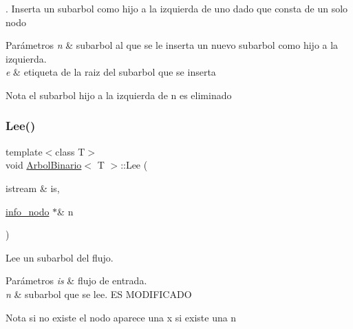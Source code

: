 . Inserta un subarbol como hijo a la izquierda de uno dado que consta de un solo nodo 


\begin{DoxyParams}{Parámetros}
{\em n} & subarbol al que se le inserta un nuevo subarbol como hijo a la izquierda. \\
\hline
{\em e} & etiqueta de la raiz del subarbol que se inserta \\
\hline
\end{DoxyParams}
\begin{DoxyNote}{Nota}
el subarbol hijo a la izquierda de n es eliminado 
\end{DoxyNote}
\mbox{\label{classArbolBinario_a4bc2c798ca826b372308d4c26e0ff4cb}} 
\subsubsection{\texorpdfstring{Lee()}{Lee()}}
{\footnotesize\ttfamily template$<$class T$>$ \\
void \hyperlink{classArbolBinario}{Arbol\+Binario}$<$ T $>$\+::Lee (\begin{DoxyParamCaption}\item[{istream \&}]{is,  }\item[{\hyperlink{structArbolBinario_1_1info__nodo}{info\+\_\+nodo} $\ast$\&}]{n }\end{DoxyParamCaption})\hspace{0.3cm}{\ttfamily [private]}}



Lee un subarbol del flujo. 


\begin{DoxyParams}{Parámetros}
{\em is} & flujo de entrada. \\
\hline
{\em n} & subarbol que se lee. ES M\+O\+D\+I\+F\+I\+C\+A\+DO \\
\hline
\end{DoxyParams}
\begin{DoxyNote}{Nota}
si no existe el nodo aparece una x si existe una n 
\end{DoxyNote}
\mbox{\label{classArbolBinario_abd35b63011c7bc50852ab039ea8500f0}} 
